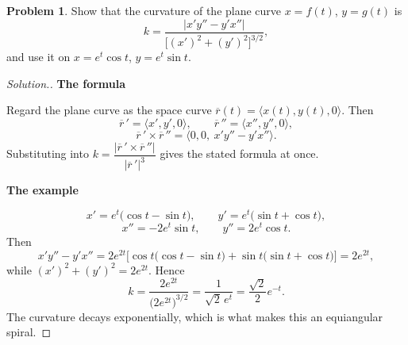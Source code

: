 \documentclass[11pt,a4paper]{article}
\theoremstyle{definition}
\newtheorem{problemx}{Problem}[subsection]
\newenvironment{problem}{\begin{problemx}}{\end{problemx}}
\newenvironment{solution}
  {\renewcommand{\qedsymbol}{}\begin{proof}[\textit{Solution}.]}
  {\end{proof}}
\newcommand{\subhead}[1]{%
  \par\medskip\noindent\textbf{#1}\par\nobreak\smallskip}
\begin{document}
\begin{problem}
Show that the curvature of the plane curve $x=f(t)$, $y=g(t)$ is
$$k = \frac{\left|x'y''-y'x''\right|}{\big[(x')^2+(y')^2\big]^{3/2}},$$
and use it on $x = e^t\cos t$, $y = e^t\sin t$.
\end{problem}
\begin{solution}
\subhead{The formula}
Regard the plane curve as the space curve
$\overline{r}(t) = \langle x(t), y(t), 0\rangle$. Then
$$\overline{r}\,' = \langle x',y',0\rangle,\qquad
\overline{r}\,'' = \langle x'',y'',0\rangle ,$$
$$\overline{r}\,'\times\overline{r}\,'' = \langle 0,0,\ x'y''-y'x''\rangle .$$
Substituting into
$k = \dfrac{\left|\overline{r}\,'\times\overline{r}\,''\right|}
{\left|\overline{r}\,'\right|^3}$ gives the stated formula at once.

\subhead{The example}
$$x' = e^t\big(\cos t-\sin t\big),\qquad y' = e^t\big(\sin t+\cos t\big),$$
$$x'' = -2e^t\sin t,\qquad y'' = 2e^t\cos t .$$
Then
$$x'y''-y'x'' = 2e^{2t}\Big[\cos t\big(\cos t-\sin t\big)
+ \sin t\big(\sin t+\cos t\big)\Big] = 2e^{2t},$$
while $(x')^2+(y')^2 = 2e^{2t}$. Hence
$$k = \frac{2e^{2t}}{\big(2e^{2t}\big)^{3/2}}
= \frac{1}{\sqrt2\,e^{t}} = \frac{\sqrt2}{2}e^{-t} .$$
The curvature decays exponentially, which is what makes this an equiangular
spiral.
\end{solution}
\end{document}
